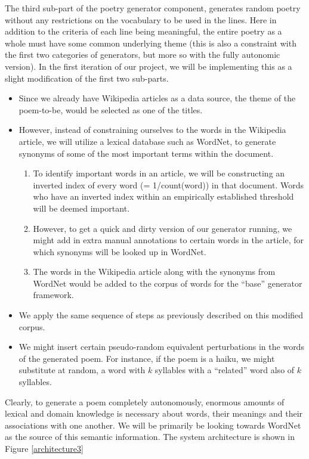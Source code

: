 \documentclass[10pt, letter,twocolumn]{IEEEtran}
\begin{document}
The third sub-part of the poetry generator component, generates random poetry without any restrictions on the vocabulary to be used in the lines. Here in addition to the criteria of each line being meaningful, the entire poetry as a whole must have some common underlying theme (this is also a constraint with the first two categories of generators, but more so with the fully autonomic version). In the first iteration of our project, we will be implementing this as a slight modification of the first two sub-parts. 
\begin{itemize}
	\item Since we already have Wikipedia articles as a data source, the theme of the poem-to-be, would be selected as one of the titles.
	\item However, instead of constraining ourselves to the words in the Wikipedia article, we will utilize a lexical database such as WordNet, to generate synonyms of some of the most important terms within the document. 
		\begin{enumerate}
			\item To identify important words in an article, we will be constructing an inverted index of every word (= 1/count(word)) in that document. Words who have an inverted index within an empirically established threshold will be deemed important.
			\item However, to get a quick and dirty version of our generator running, we might add in extra manual annotations to certain words in the article, for which synonyms will be looked up in WordNet.
			\item The words in the Wikipedia article along with the synonyms from WordNet would be added to the corpus of words for the ``base'' generator framework.
		\end{enumerate}
		\item We apply the same sequence of steps as previously described on this modified corpus.
		\item We might insert certain pseudo-random equivalent perturbations in the words of the generated poem. For instance, if the poem is a haiku, we might substitute at random, a word with $k$ syllables with a ``related'' word also of $k$ syllables.
\end{itemize}
Clearly, to generate a poem completely autonomously, enormous amounts of lexical and domain knowledge is necessary about words, their meanings and their associations with one another. We will be primarily be looking towards WordNet as the source of this semantic information. The system architecture is shown in Figure \ref{architecture3}
\end{document}
